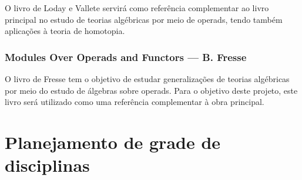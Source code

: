 \documentclass[11pt,reqno]{amsart}
\theoremstyle{definition}
\begin{document}
O livro de Loday e Vallete servirá como referência complementar ao livro
principal no estudo de teorias algébricas por meio de operads, tendo também
aplicações à teoria de homotopia.

\subsubsection{%
  \textbf{Modules Over Operads and Functors}
  --- B. Fresse~\cite{Fresse09}
}

O livro de Fresse tem o objetivo de estudar generalizações de teorias algébricas
por meio do estudo de álgebras sobre operads. Para o objetivo deste projeto,
este livro será utilizado como uma referência complementar à obra principal.

\appendix

\section{Planejamento de grade de disciplinas}\label{sec:disciplinas}
\end{document}
